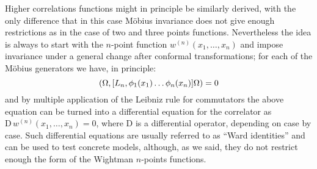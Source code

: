 \bigskip
Higher correlations functions might in principle be similarly
derived, with the only difference that in this case 
M\"obius invariance does not 
give enough restrictions as in the case of two and three points
functions. Nevertheless the idea is always to start with
the $n$-point function $w^{(n)}(x_1,\ldots,x_n)$ and impose invariance under 
a general change after conformal transformations; for each
of the M\"obius generators we have, in principle:
\[
(\Omega,[L_n,\phi_1(x_1)\ldots\phi_n(x_n)]\Omega)=0
\]
and by multiple application of the Leibniz rule for
commutators the above equation can be turned into
a differential equation for the correlator as
$\textrm{D}\,w^{(n)}(x_1,\ldots,x_n)=0$, where 
$\textrm{D}$ is a differential operator, depending
on case by case. Such differential equations are
usually referred to as ``Ward identities'' and
can be used to test concrete models, although, as
we said, they do not restrict enough the form
of the Wightman $n$-points functions.




